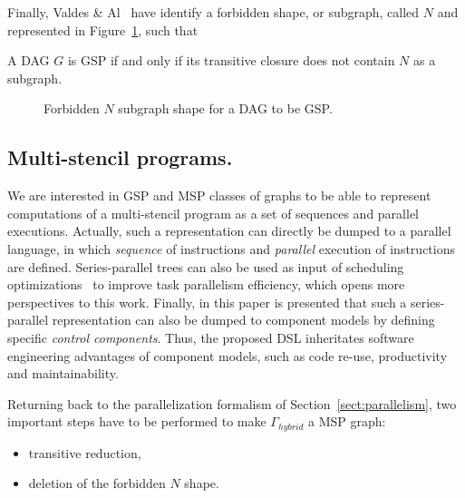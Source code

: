 Finally, Valdes \& Al~\cite{Valdes:1979:RSP:800135.804393} have identify a forbidden shape, or subgraph, called $N$ and represented in Figure~\ref{fig:n}, such that 

\begin{myth}
A DAG $G$ is GSP if and only if its transitive closure does not contain $N$ as a subgraph.
\end{myth}

\begin{figure}[h!]
\begin{center}
  \caption{Forbidden $N$ subgraph shape for a DAG to be GSP.}
  \label{fig:n}
\end{center}
\end{figure}

\subsection{Multi-stencil programs.}
We are interested in GSP and MSP classes of graphs to be able to represent computations of a multi-stencil program as a set of sequences and parallel executions. Actually, such a representation can directly be dumped to a parallel language, in which \emph{sequence} of instructions and \emph{parallel} execution of instructions are defined. Series-parallel trees can also be used as input of scheduling optimizations~\cite{Finta1996323,Wang20082684} to improve task parallelism efficiency, which opens more perspectives to this work. Finally, in this paper is presented that such a series-parallel representation can also be dumped to component models by defining specific \emph{control components}. Thus, the proposed DSL inheritates software engineering advantages of component models, such as code re-use, productivity and maintainability.

Returning back to the parallelization formalism of Section~\ref{sect:parallelism}, two important steps have to be performed to make $\Gamma_{hybrid}$ a MSP graph:
\begin{itemize}
\item transitive reduction,
\item deletion of the forbidden $N$ shape.
\end{itemize}

